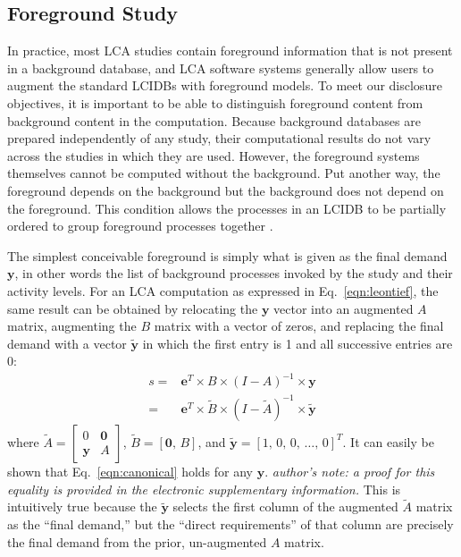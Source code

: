 \subsection{Foreground Study}

In practice, most LCA studies contain foreground information that is not present in a background database, and LCA software systems generally allow users to augment the standard LCIDBs with foreground models.  To meet our disclosure objectives, it is important to be able to distinguish foreground content from background content in the computation.  Because background databases are prepared independently of any study, their computational results do not vary across the studies in which they are used.  However, the foreground systems themselves cannot be computed without the background.  Put another way, the foreground depends on the background but the background does not depend on the foreground.  This condition allows the processes in an LCIDB to be partially ordered to group foreground processes together \citep{Kuczenski_JLCA_2015}.  

The simplest conceivable foreground is simply what is given as the final demand $\mathbf{y}$, in other words the list of background processes invoked by the study and their activity levels.  For an LCA computation as expressed in Eq.~\ref{eqn:leontief}, the same result can be obtained by relocating the $\mathbf{y}$ vector into an augmented $A$ matrix, augmenting the $B$ matrix with a vector of zeros, and replacing the final demand with a vector $\tilde{\mathbf{y}}$ in which the first entry is 1 and all successive entries are 0:
\begin{equation}
  \begin{array}{cc}
s =& \mathbf{e}^T\times B\times\left(I-A\right)^{-1}\times\mathbf{y} \\
 =& \mathbf{e}^{T}\times\tilde{B}\times\left(I-\tilde{A}\right)^{-1}\times\tilde{\mathbf{y}}
  \end{array}
  \label{eqn:canonical}
\end{equation}
where $\tilde{A} = \left[\begin{smallmatrix}
 0 & \mathbf{0} \\
 \mathbf{y} & A
  \end{smallmatrix}\right]$, $\tilde{B} = [ \mathbf{0},\, B ]$, and $\tilde{\mathbf{y}} =  [ 1,\, 0,\, 0 ,\,\ldots,\, 0]^{T}$.
It can easily be shown that Eq.~\ref{eqn:canonical} holds for any $\mathbf{y}$.  \textit{author's note: a proof for this equality is provided in the electronic supplementary information.}  This is intuitively true because the $\tilde{\mathbf{y}}$ selects the first column of the augmented $\tilde{A}$ matrix as the ``final demand,'' but the ``direct requirements'' of that column are precisely the final demand from the prior, un-augmented $A$ matrix.  

